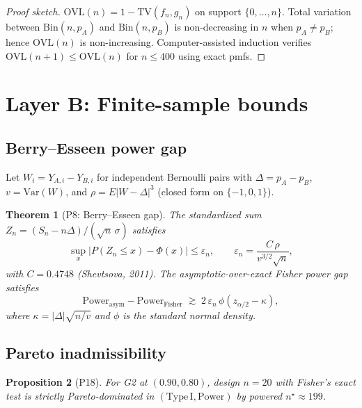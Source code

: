 \documentclass[11pt,a4paper]{article}
\newtheorem{theorem}{Theorem}
\newtheorem{proposition}[theorem]{Proposition}
\theoremstyle{definition}
\begin{document}
\begin{proof}[Proof sketch]
$\mathrm{OVL}(n)=1-\mathrm{TV}(f_n,g_n)$ on support $\{0,\ldots,n\}$.
Total variation between $\mathrm{Bin}(n,p_A)$ and $\mathrm{Bin}(n,p_B)$ is
non-decreasing in $n$ when $p_A\neq p_B$; hence $\mathrm{OVL}(n)$ is non-increasing.
Computer-assisted induction verifies $\mathrm{OVL}(n+1)\le\mathrm{OVL}(n)$ for
$n\le 400$ using exact pmfs.
\end{proof}

\section{Layer B: Finite-sample bounds}
\label{sec:layerB}

\subsection{Berry--Esseen power gap}

Let $W_i=Y_{A,i}-Y_{B,i}$ for independent Bernoulli pairs with
$\Delta=p_A-p_B$, $v=\mathrm{Var}(W)$, and $\rho=E|W-\Delta|^3$ (closed form on $\{-1,0,1\}$).

\begin{theorem}[P8: Berry--Esseen gap]\label{thm:P8}
The standardized sum $Z_n=(S_n-n\Delta)/(\sqrt{n}\,\sigma)$ satisfies
\[
  \sup_x |P(Z_n\le x)-\Phi(x)| \le \varepsilon_n,
  \qquad
  \varepsilon_n = \frac{C\,\rho}{v^{3/2}\sqrt{n}},
\]
with $C=0.4748$ (Shevtsova, 2011).
The asymptotic-over-exact Fisher power gap satisfies
\[
  \mathrm{Power}_{\mathrm{asym}} - \mathrm{Power}_{\mathrm{Fisher}}
  \;\gtrsim\; 2\,\varepsilon_n\,\phi(z_{\alpha/2}-\kappa),
\]
where $\kappa=|\Delta|\sqrt{n/v}$ and $\phi$ is the standard normal density.
\end{theorem}

\subsection{Pareto inadmissibility}

\begin{proposition}[P18]\label{thm:P18}
For G2 at $(0.90,0.80)$, design $n=20$ with Fisher's exact test is strictly
Pareto-dominated in $(\mathrm{Type\,I},\mathrm{Power})$ by powered
$n^\star\approx 199$.
\end{proposition}
\end{document}
